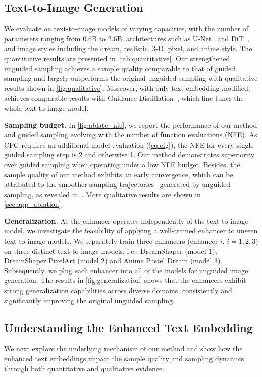 


\subsection{Text-to-Image Generation}
\label{sec:t2i}
We evaluate \ourName on text-to-image models of varying capacities, with the number of parameters ranging from 0.6B to 2.6B, architectures such as U-Net~\cite{ronneberger2015u} and DiT~\cite{peebles2023scalable}, and image styles including the dream, realistic, 3-D, pixel, and anime style. The quantitative results are presented in \cref{tab:quantitative}. Our strengthened unguided sampling achieves a sample quality comparable to that of guided sampling and largely outperforms the original unguided sampling with qualitative results shown in \cref{fig:qualitative}. Moreover, with only text embedding modified, \ourName achieves comparable results with Guidance Distillation~\cite{meng2023distillation}, which fine-tunes the whole text-to-image model.


\textbf{Sampling budget.} 
In \cref{fig:ablate_nfe}, we report the performance of our method and guided sampling evolving with the number of function evaluations (NFE). As CFG requires an additional model evaluation (\cref{eq:cfg}), the NFE for every single guided sampling step is 2 and otherwise 1. 
Our method demonstrates superiority over guided sampling when operating under a low NFE budget.
Besides, the sample quality of our method exhibits an early convergence, which can be attributed to the smoother sampling trajectories~\cite{chen2024trajectory} generated by unguided sampling, as revealed in~\cite{zhou2024simple}. More qualitative results are shown in \cref{sec:app_ablation}.


\textbf{Generalization.} As the enhancer operates independently of the text-to-image model, we investigate the feasibility of applying a well-trained enhancer to unseen text-to-image models. We separately train three enhancers (enhancer $i$, $i=1,2,3$) on three distinct text-to-image models, i.e., DreamShaper (model $1$), DreamShaper PixelArt (model $2$) and Anime Pastel Dream (model $3$). Subsequently, we plug each enhancer into all of the models for unguided image generation. The results in \cref{fig:generalization} shows that the enhancers exhibit strong generalization capabilities across diverse domains, consistently and significantly improving the original unguided sampling.

\subsection{Understanding the Enhanced Text Embedding}
\label{sec:discussions}
We next explore the underlying mechanism of our method and show how the enhanced text embeddings impact the sample quality and sampling dynamics through both quantitative and qualitative evidence. 

